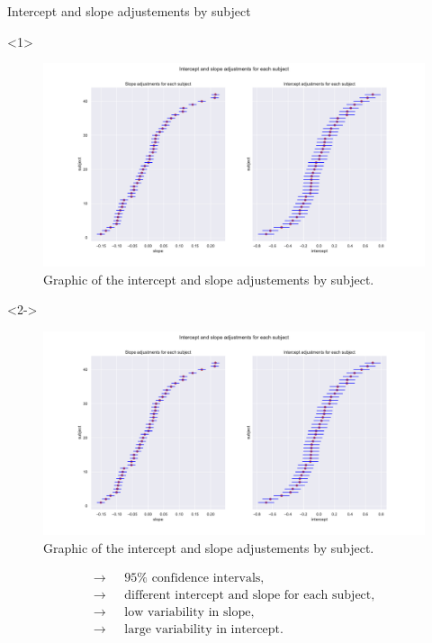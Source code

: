 \documentclass[unknownkeysallowed]{beamer}
\begin{document}
\begin{frame}{Intercept and slope adjustements by subject}
\begin{onlyenv}<1>
\begin{figure}[H]
    \centering
    \includegraphics[scale=.24]{./images/model2_inter.pdf}
    \caption{Graphic of the intercept and slope adjustements by subject.}
    \end{figure}
\vspace{-0.3cm}
\end{onlyenv}
\begin{onlyenv}<2->
 \begin{figure}[H]
    \centering
    \includegraphics[scale=.24]{./images/model2_inter.pdf}
    \caption{Graphic of the intercept and slope adjustements by subject.}
    \end{figure}
\begin{align*}
    \longrightarrow \text{ }& 95\% \text{ confidence intervals},\\
    \longrightarrow \text{ }& \text{different intercept and slope for each subject},\\
    \longrightarrow \text{ }& \text{low variability in slope},\\
    \longrightarrow \text{ }& \text{large variability in intercept}.
\end{align*}
\end{onlyenv}
\end{frame}
\end{document}
